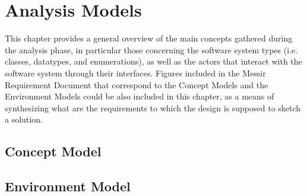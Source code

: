 \chapter{Analysis Models}
\label{chap:AM}

This chapter provides a general overview of the main concepts gathered during
the analysis phase, in particular those concerning the software system types
(i.e. classes, datatypes, and enumerations), as well as the actors that interact
with the software system through their interfaces. Figures included in the
Messir Requirement Document that correspond to the \glspl{Concept Model} and the \glspl{Environment
Model} could be also included in this chapter, as a means of synthesizing what
are the requirements to which the design is supposed to sketch a solution.




\section{Concept Model}
 



   

\section{Environment Model}
